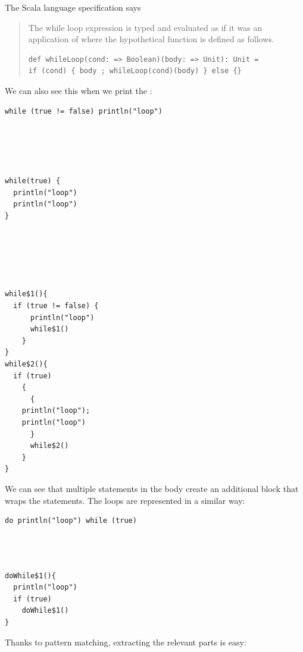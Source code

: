The Scala language specification \cite{ScalaLanguageSpecification} says 

\begin{quotation}
The while loop expression  is typed and evaluated as if it was an application of  where the hypothetical function  is defined as follows.

\begin{lstlisting}
def whileLoop(cond: => Boolean)(body: => Unit): Unit =
if (cond) { body ; whileLoop(cond)(body) } else {}
\end{lstlisting}

\end{quotation} 

We can also see this when we print the :

\begin{multicols}{2}
\begin{lstlisting}
while (true != false) println("loop")





while(true) {
  println("loop")
  println("loop")
}






\end{lstlisting}
\begin{lstlisting}
while$1(){
  if (true != false) {
      println("loop")
      while$1()
    }
}
while$2(){
  if (true)
    {
      {
	println("loop");
	println("loop")
      }
      while$2()
    }
}
\end{lstlisting}
\end{multicols}

We can see that multiple statements in the body create an additional block that wraps the statements. The  loops are represented in a similar way:

\begin{multicols}{2}
\begin{lstlisting}
do println("loop") while (true)




\end{lstlisting}
\begin{lstlisting}
doWhile$1(){
  println("loop")
  if (true)
    doWhile$1()
}
\end{lstlisting}
\end{multicols}

Thanks to pattern matching, extracting the relevant parts is easy:

